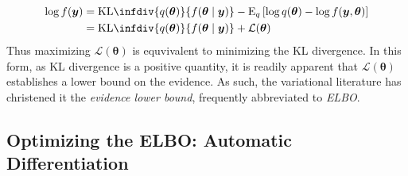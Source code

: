     \[
        \begin{aligned}
        \log f(\bm{y}) 
            &= \text{KL}\infdiv{q(\bm{\theta})}{f(\bm{\theta}\mid\bm{y})}
                - \text{E}_q\left[
                \log q(\bm{\theta}) - \log f(\bm{y},\bm{\theta})
                \right]\\
            &= \text{KL}\infdiv{q(\bm{\theta})}{f(\bm{\theta}\mid\bm{y})}
                + \mathcal{L}(\bm{\theta})
        \end{aligned}
    \]
    Thus maximizing $\mathcal{L}(\bm{\theta})$ is equvivalent to minimizing the 
    KL divergence. In this form, as KL divergence is a positive quantity, it is
    readily apparent that $\mathcal{L}(\bm{\theta})$ establishes a lower bound
    on the evidence.  As such, the variational literature has christened it the
    \emph{evidence lower bound}, frequently abbreviated to \emph{ELBO}.
    
\subsection{Optimizing the ELBO: Automatic Differentiation}




